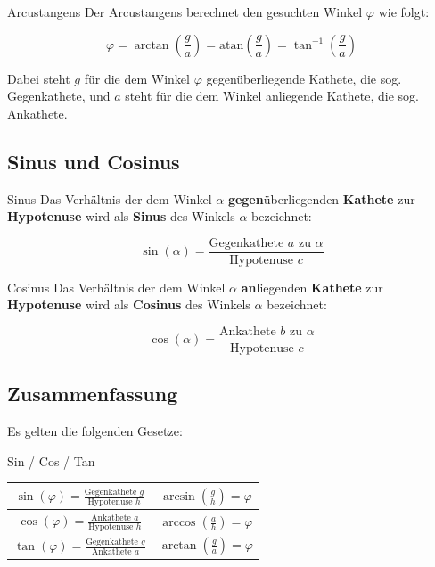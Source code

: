 \begin{bemerkung}{Arcustangens}{}
  Der Arcustangens berechnet den gesuchten Winkel $\varphi$ wie folgt:
  
  $$\varphi = \arctan\left(\frac{g}{a}\right) = \text{atan}\left(\frac{g}a\right) = \tan^{-1}\left(\frac{g}a\right)$$

  Dabei steht $g$ für die dem Winkel $\varphi$ gegenüberliegende Kathete, die
  sog. Gegenkathete, und  $a$ steht für die dem Winkel
  anliegende Kathete, die sog. Ankathete.

  \end{bemerkung}


\subsection{Sinus und Cosinus}

\begin{definition}{Sinus}{}
  Das Verhältnis der dem Winkel $\alpha$ \textbf{gegen}überliegenden \textbf{Kathete} zur \textbf{Hypotenuse}
  wird als \textbf{Sinus} des Winkels $\alpha$ bezeichnet:

  $$\sin(\alpha) = \frac{\text{Gegenkathete } a \text{ zu } \alpha}
  {\text{Hypotenuse } c}$$
\end{definition}

\begin{definition}{Cosinus}{}
  Das Verhältnis der dem Winkel $\alpha$ \textbf{an}liegenden \textbf{Kathete} zur \textbf{Hypotenuse}
  wird als \textbf{Cosinus}  des Winkels $\alpha$ bezeichnet:

  $$\cos(\alpha) = \frac{\text{Ankathete } b \text{ zu } \alpha}
  {\text{Hypotenuse } c}$$
\end{definition}

\newpage

\subsection{Zusammenfassung}
Es gelten die folgenden Gesetze:

\begin{gesetz}{Sin / Cos / Tan}{}
  
  \begin{tabular}{|c|c|}\hline
  $\sin(\varphi) = \frac{\text{Gegenkathete } g}{\text{Hypotenuse }  h}$  & $\arcsin\left(\frac{g}h\right) = \varphi$\\\hline
  $\cos(\varphi) = \frac{\text{Ankathete    } a}{\text{Hypotenuse }  h}$  & $\arccos\left(\frac{a}h\right) = \varphi$\\\hline
  $\tan(\varphi) = \frac{\text{Gegenkathete } g}{\text{Ankathete  }  a}$  & $\arctan\left(\frac{g}a\right) = \varphi$\\\hline
  \end{tabular}
  
\end{gesetz}


